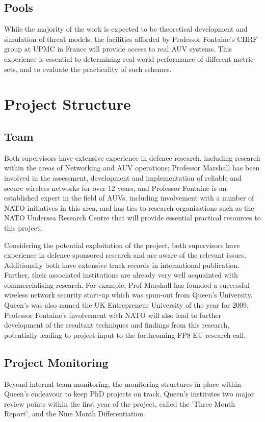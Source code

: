 \documentclass[oneside,11pt,a4paper]{Latex/Classes/PhDthesisPSnPDF}
\begin{document}
\begin{doublespace}
\subsection{Pools}  While the majority of the work is expected to be
theoretical development and simulation of threat models, the facilities afforded by
Professor Fontaine's CIIRF group at UPMC in France will provide access to real
AUV systems. This experience is essential to determining real-world performance
of different metric-sets, and to evaluate the practicality of such schemes.

\section{Project Structure}  
\subsection{Team}
Both supervisors have extensive experience in defence
research, including research within the areas of Networking and AUV operations;
Professor Marshall has been involved in the assessment, development and implementation of reliable and secure wireless networks for over 12 years,
and Professor Fontaine is an established expert in the field of AUVs, including
involvement with a number of NATO initiatives in this area, and has ties to
research organisations such as the NATO Undersea Research Centre that will
provide essential practical resources to this project.

Considering the potential exploitation of the project, both supervisors have
experience in defence sponsored research and are aware of the relevant issues.
Additionally both have extensive track records in international publication.
Further, their associated institutions are already very well acquainted with
commercialising research. For example, Prof Marshall has founded a successful
wireless network security start-up which was spun-out from Queen's University.
Queen's was also named the UK Entrepreneur University of the year for 2009.
Professor Fontaine's involvement with NATO will also lead to further development
of the resultant techniques and findings from this research, potentially leading
to project-input to the forthcoming FP8 EU research call.

\subsection{Project Monitoring}  
Beyond internal team monitoring, the monitoring structures in
place within Queen's endeavour to keep PhD projects on track. Queen's institutes
two major review points within the first year of the project, called the 'Three Month
Report', and the Nine Month Differentiation.


\end{doublespace}
\end{document}
